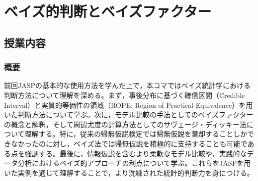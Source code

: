 \section{ベイズ的判断とベイズファクター}
\label{b28_bayes_judgement}

\subsection{授業内容}

\subsubsection{概要}
前回JASPの基本的な使用方法を学んだ上で，本コマではベイズ統計学における判断方法について理解を深める。まず，事後分布に基づく確信区間（Credible Interval）と実質的等価性の領域（ROPE: Region of Practical Equivalence）を用いた判断方法について学ぶ。次に，モデル比較の手法としてのベイズファクターの概念と解釈，そして周辺尤度の計算方法としてのサヴェージ・ディッキー法について理解する。特に，従来の帰無仮説検定では帰無仮説を棄却することしかできなかったのに対し，ベイズ法では帰無仮説を積極的に支持することも可能である点を強調する。最後に，情報仮説を含むより柔軟なモデル比較や，実践的なデータ分析におけるベイズ的アプローチの利点について学ぶ。これらをJASPを用いた実例を通じて理解することで，より洗練された統計的判断力を身につける。

